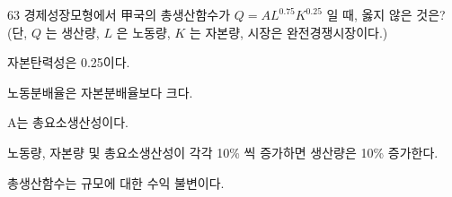 \begin{question}{63}
경제성장모형에서 甲국의 총생산함수가 $Q=AL^{0.75}K^{0.25}$ 일 때, 옳지 않은 것은? (단, $Q$ 는 생산량, $L$ 은 노동량, $K$ 는 자본량, 시장은 완전경쟁시장이다.)
\begin{choices}
  \item 자본탄력성은 0.25이다.
  \item 노동분배율은 자본분배율보다 크다.
  \item A는 총요소생산성이다.
  \item 노동량, 자본량 및 총요소생산성이 각각 10\% 씩 증가하면 생산량은 10\% 증가한다.
  \item 총생산함수는 규모에 대한 수익 불변이다.
\end{choices}
\end{question}
